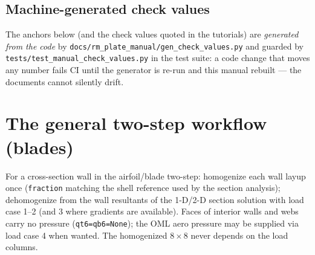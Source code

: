 \documentclass[11pt]{article}
\newcommand{\code}[1]{\texttt{#1}}
\begin{document}
\subsection{Machine-generated check values}
The anchors below (and the check values quoted in the tutorials) are
\emph{generated from the code} by
\code{docs/rm\_plate\_manual/gen\_check\_values.py} and guarded by
\code{tests/test\_manual\_check\_values.py} in the test suite: a code
change that moves any number fails CI until the generator is re-run
and this manual rebuilt --- the documents cannot silently drift.


\section{The general two-step workflow (blades)}
For a cross-section wall in the airfoil/blade two-step: homogenize
each wall layup once (\code{fraction} matching the shell reference
used by the section analysis); dehomogenize from the wall resultants
of the 1-D/2-D section solution with load case 1--2 (and 3 where
gradients are available).  Faces of interior walls and webs carry no
pressure (\code{qt6=qb6=None}); the OML aero pressure may be supplied
via load case 4 when wanted.  The homogenized $8\times8$ never
depends on the load columns.

\appendix
\end{document}
